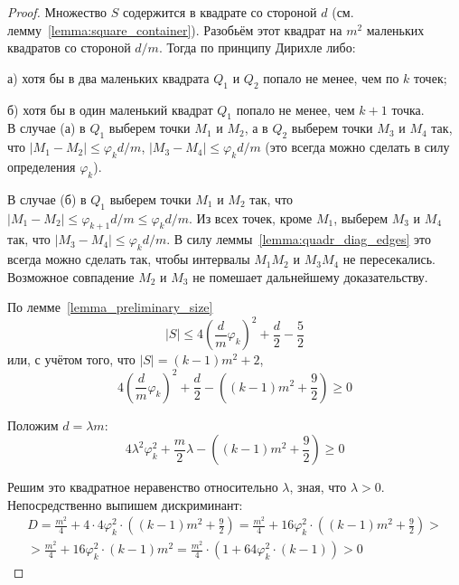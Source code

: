 \begin{proof}
	Множество $S$ содержится в квадрате со стороной $d$ (см. лемму~\ref{lemma:square_container}).
	Разобьём этот квадрат на $m^2$ маленьких квадратов со стороной $d/m$.
	Тогда по принципу Дирихле либо:

	а) хотя бы в два маленьких квадрата $Q_1$ и $Q_2$ попало не менее, чем по $k$ точек;

	б) хотя бы в один маленький квадрат $Q_1$ попало не менее, чем $k+1$ точка.
	\\
	В случае (а) в $Q_1$ выберем точки $M_1$ и $M_2$,
	а в $Q_2$ выберем точки $M_3$ и $M_4$
	так, что $|M_1 - M_2| \leq \varphi_k d /m$, $|M_3 - M_4| \leq \varphi_k d/m$
	(это всегда можно сделать в силу определения $\varphi_k$).

	В случае (б) в $Q_1$ выберем точки $M_1$ и $M_2$ так, что
	$|M_1 - M_2| \leq \varphi_{k+1} d /m \leq \varphi_k d /m$.
	Из всех точек, кроме $M_1$, выберем $M_3$ и $M_4$ так, что
	$|M_3 - M_4| \leq \varphi_k d/m$.
	В силу леммы~\ref{lemma:quadr_diag_edges} это всегда можно сделать так,
	чтобы интервалы $M_1 M_2$ и $M_3 M_4$ не пересекались.
	Возможное совпадение $M_2$ и $M_3$ не помешает дальнейшему доказательству.

	По лемме~\ref{lemma_preliminary_size}
	\begin{equation}
		|S| \leq 4 \left( \frac{d}{m} \varphi_k \right)^2 + \frac{d}{2} - \frac{5}{2}
	\end{equation}
	или, с учётом того, что $ |S| = (k-1)m^2 + 2$,
	\begin{equation}
		 4 \left( \frac{d}{m} \varphi_k \right)^2 + \frac{d}{2} - \left( (k-1)m^2 + \frac{9}{2}\right) \geq 0
	\end{equation}

	Положим $d = \lambda m$:
	\begin{equation}
		 4 \lambda^2 \varphi_k^2 + \frac{m}{2} \lambda - \left( (k-1)m^2 + \frac{9}{2}\right) \geq 0
	\end{equation}

	Решим это квадратное неравенство относительно $\lambda$,
	зная, что $\lambda > 0$.
	Непосредственно выпишем дискриминант:
	\begin{multline}
		D =
		\frac{m^2}{4} + 4 \cdot 4 \varphi_k^2 \cdot \left( (k-1)m^2 + \frac{9}{2}\right)
		=
		\frac{m^2}{4} + 16 \varphi_k^2 \cdot \left( (k-1)m^2 + \frac{9}{2}\right)
		>\\>
		\frac{m^2}{4} + 16 \varphi_k^2 \cdot (k-1)m^2
		=
		\frac{m^2}{4} \cdot (1 + 64 \varphi_k^2 \cdot (k-1))
		> 0
	\end{multline}


\end{proof}
